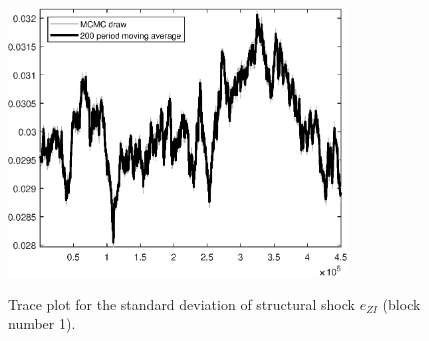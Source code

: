 \begin{figure}[H]
\centering
  \includegraphics[width=0.8\textwidth]{BRS_sectoral_wo_demand_shocks/graphs/TracePlot_SE_e_ZI_blck_1}\\
    \caption{Trace plot for the standard deviation of structural shock ${e_{ZI}}$ (block number 1).}
\end{figure}
